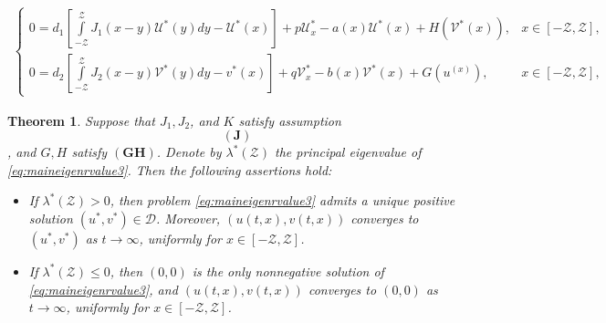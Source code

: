 \documentclass[a4paper,11pt]{amsart}
\newtheorem{theorem}{Theorem}
\theoremstyle{definition}
\numberwithin{equation}{section}
\theoremstyle{definition}
\begin{document}
\begin{align}\label{eq:main-problem12}
\left\{\begin{array}{lll}
0 =  d_1\left[\displaystyle\int\limits_{-\mathcal{Z}}^{\mathcal{Z}}J_1(x-y) \mathscr U^\ast(y)dy - \mathscr U^\ast(x)\right] +p\mathscr U^\ast_x- a(x)\mathscr U^\ast(x) + H\left(\mathscr V^\ast (x)\right), & x\in \left[-\mathcal{Z}, \mathcal{Z}\right], \\
0 = d_2\left[\displaystyle\int\limits_{-\mathcal{Z}}^{\mathcal{Z}}J_2(x-y)\mathscr V^\ast(y)dy - v^\ast(x)\right]+q\mathscr V^\ast_x -b(x)\mathscr V^\ast(x)+ G\left(u^(x)\right), & x\in \left[-\mathcal{Z}, \mathcal{Z}\right], \end{array}\right.
\end{align}



\begin{theorem}\label{thm:existence-stability}
Suppose that $J_1, J_2$, and $K$ satisfy assumption $$(\mathbf{J})$$, and $G, H$ satisfy $(\mathbf{GH})$.
Denote by $\lambda^\ast(\mathcal Z)$ the principal eigenvalue of \eqref{eq:maineigenrvalue3}. Then the following assertions hold:
\begin{itemize}
\item[(i)] If $\lambda^\ast(\mathcal Z) > 0$, then problem \eqref{eq:maineigenrvalue3} admits a unique positive solution $(u^\ast, v^\ast)\in\mathcal D$. Moreover, $(u(t,x), v(t,x))$ converges to $(u^\ast, v^\ast)$ as $t\to\infty$, uniformly for $x\in[-\mathcal Z, \mathcal Z]$.
\item[(ii)] If $\lambda^\ast(\mathcal Z) \leq 0$, then $(0,0)$ is the only nonnegative solution of \eqref{eq:maineigenrvalue3}, and $(u(t,x), v(t,x))$ converges to $(0,0)$ as $t\to\infty$, uniformly for $x\in[-\mathcal Z, \mathcal Z]$.
\end{itemize}
\end{theorem}
\end{document}
